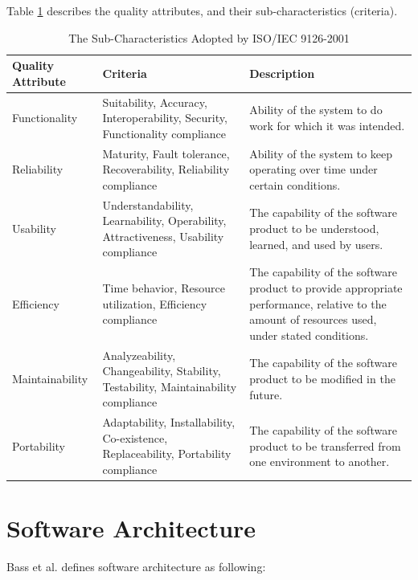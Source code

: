 Table \ref{tab:qattribute} describes the quality attributes, and their sub-characteristics (criteria).

\begin{table}[ht!]
	\centering
	\begin{tabular}{ | l | p{4cm} | p{6cm} |}
	\hline
	\textbf{Quality Attribute} & \textbf{Criteria} & \textbf{Description} \\ \hline
	Functionality 		&	Suitability, Accuracy, Interoperability, Security, Functionality compliance 	&	Ability of the system to do work for which it was intended. \\ \hline
	Reliability 		&	Maturity, Fault tolerance, Recoverability, Reliability compliance	&	Ability of the system to keep operating over time under certain conditions. \\ \hline
	Usability 			&	Understandability, Learnability, Operability, Attractiveness, Usability compliance 	 &	The capability of the software product to be understood, learned, and used by users. \\ \hline
	Efficiency 			&	Time behavior, Resource utilization, Efficiency compliance	 &	The capability of the software product to provide appropriate performance, relative to the amount of resources used, under stated conditions. \\ \hline
	Maintainability 	&	Analyzeability, Changeability, Stability, Testability, Maintainability compliance	 &	The capability of the software product to be modified in the future.\\ \hline
	Portability 		&	Adaptability, Installability, Co-existence, Replaceability, Portability compliance 	 &	The capability of the software product to be transferred from one environment to another. \\ \hline
	\end{tabular}
	\caption{The Sub-Characteristics Adopted by ISO/IEC 9126-2001} \label{tab:qattribute}
\end{table}







\section{Software Architecture}
\label{sec:2-SA}
Bass et al.\cite{Bass:2012:SAP:2392670} defines software architecture as following: 

